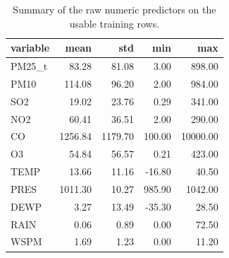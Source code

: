\begin{table}[t]
\centering
\small
\caption{Summary of the raw numeric predictors on the usable training rows.}
\label{tab:table_S15_variable_summary_train}
\begin{tabular}{lrrrr}
\toprule
variable & mean & std & min & max \\
\midrule
PM25\_t & 83.28 & 81.08 & 3.00 & 898.00 \\
PM10 & 114.08 & 96.20 & 2.00 & 984.00 \\
SO2 & 19.02 & 23.76 & 0.29 & 341.00 \\
NO2 & 60.41 & 36.51 & 2.00 & 290.00 \\
CO & 1256.84 & 1179.70 & 100.00 & 10000.00 \\
O3 & 54.84 & 56.57 & 0.21 & 423.00 \\
TEMP & 13.66 & 11.16 & -16.80 & 40.50 \\
PRES & 1011.30 & 10.27 & 985.90 & 1042.00 \\
DEWP & 3.27 & 13.49 & -35.30 & 28.50 \\
RAIN & 0.06 & 0.89 & 0.00 & 72.50 \\
WSPM & 1.69 & 1.23 & 0.00 & 11.20 \\
\bottomrule
\end{tabular}
\end{table}
